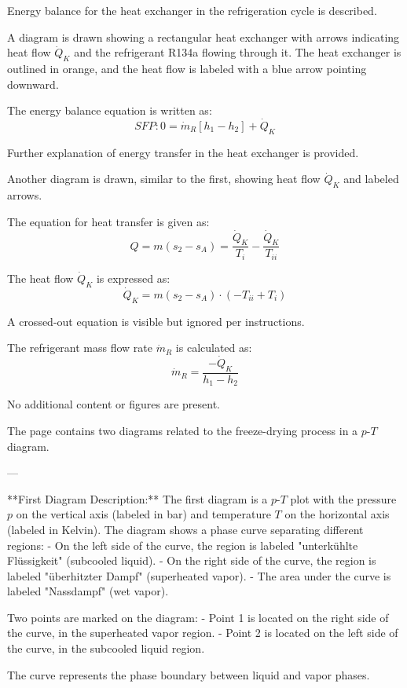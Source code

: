 Energy balance for the heat exchanger in the refrigeration cycle is described.  

A diagram is drawn showing a rectangular heat exchanger with arrows indicating heat flow \( \dot{Q}_K \) and the refrigerant R134a flowing through it. The heat exchanger is outlined in orange, and the heat flow is labeled with a blue arrow pointing downward.  

The energy balance equation is written as:  
\[
SFP: 0 = \dot{m}_R [h_1 - h_2] + \dot{Q}_K
\]  

Further explanation of energy transfer in the heat exchanger is provided.  

Another diagram is drawn, similar to the first, showing heat flow \( \dot{Q}_K \) and labeled arrows.  

The equation for heat transfer is given as:  
\[
Q = m(s_2 - s_A) = \frac{\dot{Q}_K}{T_i} - \frac{\dot{Q}_K}{T_{ii}}
\]  

The heat flow \( \dot{Q}_K \) is expressed as:  
\[
\dot{Q}_K = m(s_2 - s_A) \cdot (-T_{ii} + T_{i})
\]  

A crossed-out equation is visible but ignored per instructions.  

The refrigerant mass flow rate \( \dot{m}_R \) is calculated as:  
\[
\dot{m}_R = \frac{-\dot{Q}_K}{h_1 - h_2}
\]  

No additional content or figures are present.

The page contains two diagrams related to the freeze-drying process in a \( p \)-\( T \) diagram.

---

**First Diagram Description:**  
The first diagram is a \( p \)-\( T \) plot with the pressure \( p \) on the vertical axis (labeled in bar) and temperature \( T \) on the horizontal axis (labeled in Kelvin). The diagram shows a phase curve separating different regions:  
- On the left side of the curve, the region is labeled "unterkühlte Flüssigkeit" (subcooled liquid).  
- On the right side of the curve, the region is labeled "überhitzter Dampf" (superheated vapor).  
- The area under the curve is labeled "Nassdampf" (wet vapor).  

Two points are marked on the diagram:  
- Point 1 is located on the right side of the curve, in the superheated vapor region.  
- Point 2 is located on the left side of the curve, in the subcooled liquid region.  

The curve represents the phase boundary between liquid and vapor phases.

